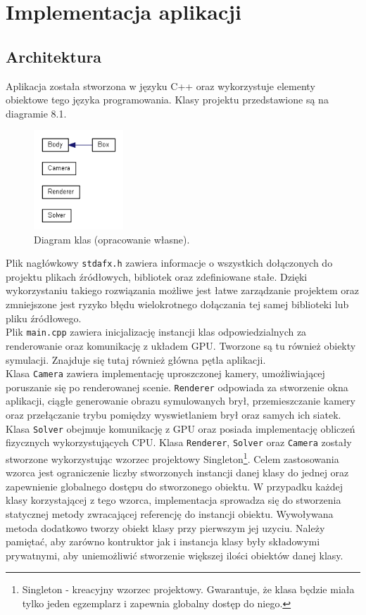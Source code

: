 \chapter{Implementacja aplikacji}

\section{Architektura}
Aplikacja została stworzona w języku C++ oraz wykorzystuje elementy obiektowe tego języka programowania. Klasy projektu przedstawione są na diagramie 8.1.\\
\begin{figure}[h]
\centering
\includegraphics[width=0.3\textwidth]{figures/classes.png}
\caption{Diagram klas (opracowanie własne).}%
\label{rys:Podzial klas}
\end{figure}
Plik nagłówkowy \verb$stdafx.h$ zawiera informacje o wszystkich dołączonych do projektu plikach źródłowych, bibliotek oraz zdefiniowane stałe. Dzięki wykorzystaniu takiego rozwiązania możliwe jest łatwe zarządzanie projektem oraz zmniejszone jest ryzyko błędu wielokrotnego dołączania tej samej biblioteki lub pliku źródłowego.\\
Plik \verb$main.cpp$ zawiera inicjalizację instancji klas odpowiedzialnych za renderowanie oraz komunikację z układem GPU. Tworzone są tu również obiekty symulacji. Znajduje się tutaj również główna pętla aplikacji.\\
Klasa \verb$Camera$ zawiera implementację uproszczonej kamery, umożliwiającej poruszanie się po renderowanej scenie.
\verb$Renderer$ odpowiada za stworzenie okna aplikacji, ciągłe generowanie obrazu symulowanych brył, przemieszczanie kamery oraz przełączanie trybu pomiędzy wyswietlaniem brył oraz samych ich siatek.
Klasa \verb$Solver$ obejmuje komunikację z GPU oraz posiada implementację obliczeń fizycznych wykorzystujących CPU.
Klasa \verb$Renderer$, \verb$Solver$ oraz \verb$Camera$ zostały stworzone wykorzystując wzorzec projektowy Singleton\footnote{Singleton - kreacyjny wzorzec projektowy. Gwarantuje, że klasa będzie miała tylko jeden egzemplarz i zapewnia globalny dostęp do niego\cite{Wzorce projektowe}.}. Celem zastosowania wzorca jest ograniczenie liczby stworzonych instancji danej klasy do jednej oraz zapewnienie globalnego dostępu do stworzonego obiektu. W przypadku każdej klasy korzystającej z tego wzorca, implementacja sprowadza się do stworzenia statycznej metody zwracającej referencję do instancji obiektu. Wywoływana metoda dodatkowo tworzy obiekt klasy przy pierwszym jej uzyciu. Należy pamiętać, aby zarówno kontruktor jak i instancja klasy były składowymi prywatnymi, aby uniemożliwić stworzenie większej ilości obiektów danej klasy.\\
